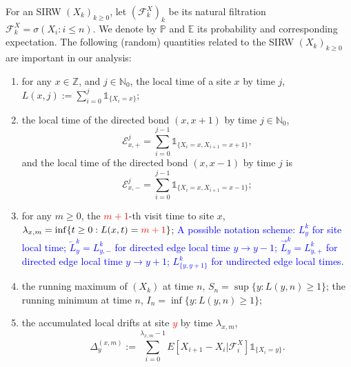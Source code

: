 \documentclass[twoside,12pt,a4paper]{article}
\numberwithin{equation}{section}
\newcommand{\edt}[1]{\textcolor{red}{#1}} %
\newcommand{\comment}[1]{\textcolor{blue}{#1}}
\begin{document}
	For an SIRW $(X_k)_{k\geq 0}$,  let $(\mathcal{F}^X_k)_k$ be its natural filtration $\mathcal{F}^X_k = \sigma\left(X_i: i\leq n \right).$ We denote by $\mathbb{P}$ and $\mathbb{E}$ its probability and corresponding expectation. The following (random) quantities related to the SIRW $(X_k)_{k\geq0}$ are important in our analysis:
	\begin{enumerate}
		\item for any $x \in \mathbb{Z}$, and $j\in \mathbb{N}_0$, the local time of a site $x$ by time $j$, $L(x,j):= \sum_{i=0}^j \mathbb{1}_{\{X_i=x\} }$; %
		
		\item the local time of the directed bond $(x,x+1)$ by time $j\in \mathbb{N}_0$,
		$$ \mathcal{E}^j_{x,+} = \sum_{i=0}^{j-1} \mathbb{1}_{\{X_i=x, X_{i+1} =x+1 \} } ,$$
		and the local time of the directed bond $(x,x-1)$ by time $j$ is 
		$$ \mathcal{E}^j_{x,-} = \sum_{i=0}^{j-1} \mathbb{1}_{\{X_i=x, X_{i+1} =x-1 \} }; $$
		
		
		\item for any $m\geq 0$, the \edt{$m+1$}-th visit time to site $x$, $\lambda_{x,m} = \inf\{t \geq 0: L(x,t) = \edt{m+1} \}$;
			\comment{A possible notation scheme: $L_y^k$ for site local time; $\overleftarrow{L}_y^k = L_{y, -}^k$ for directed edge local time $y \to y-1$; $\overrightarrow{L}_y^k = L_{y, +}^k$ for directed edge local time  $y \to y+1$; $L_{\{y, y+1\}}^k $ for undirected edge local times.}
		
		\item the running maximum of $(X_k)$ at time $n$, $S_n= \sup\{y: L(y,n)\geq 1 \} $; the running minimum at time $n$, $I_n= \inf\{y: L(y,n)\geq 1 \} $;
		
		\item 
		the accumulated local drifts at site \edt{$y$} by time $\lambda_{x,m}$, 
		\begin{equation}\label{eq: accumulated local drift}
			\Delta_y^{(x,m)}:= \sum_{i=0}^{\lambda_{x,m}-1} E[X_{i+1}-X_i\vert \mathcal{F}_{i}^X] \mathbb{1}_{\{X_i=y\}}.
		\end{equation}
	\end{enumerate}
\end{document}

